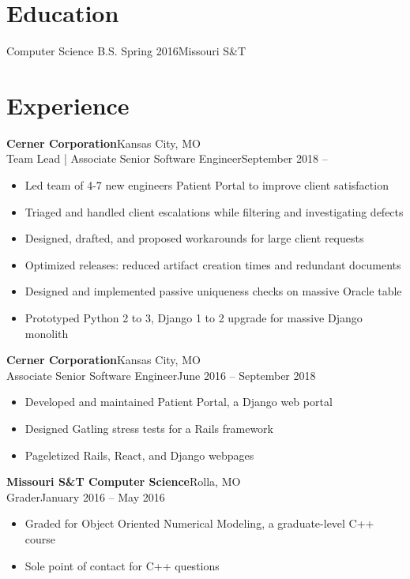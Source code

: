 \documentclass[margin]{res}
\begin{document}
  \begin{resume}
    \section{Education}
      Computer Science B.S. Spring 2016\hfill Missouri S\&T\\
    \section{Experience}
       \textbf{Cerner Corporation}\hfill Kansas City, MO\\
         Team Lead | Associate Senior Software Engineer\hfill September 2018 --
         \begin{itemize} \itemsep -1pt  %
            \item Led team of 4-7 new engineers Patient Portal to improve client satisfaction
            \item Triaged and handled client escalations while filtering and investigating defects
            \item Designed, drafted, and proposed workarounds for large client requests
            \item Optimized releases: reduced artifact creation times and redundant documents
            \item Designed and implemented passive uniqueness checks on massive Oracle table
            \item Prototyped Python 2 to 3, Django 1 to 2 upgrade for massive Django monolith
         \end{itemize}

       \textbf{Cerner Corporation}\hfill Kansas City, MO\\
         Associate Senior Software Engineer\hfill June 2016 -- September 2018
         \begin{itemize} \itemsep -1pt  %
            \item Developed and maintained Patient Portal, a Django web portal
            \item Designed Gatling stress tests for a Rails framework
            \item Pageletized Rails, React, and Django webpages
         \end{itemize}

      \textbf{Missouri S\&T Computer Science}\hfill Rolla, MO\\
         Grader\hfill January 2016 -- May 2016
         \begin{itemize} \itemsep -1pt  %
           \item Graded for Object Oriented Numerical Modeling, a graduate-level C++ course
           \item Sole point of contact for C++ questions
         \end{itemize}


\end{resume}
\end{document}
